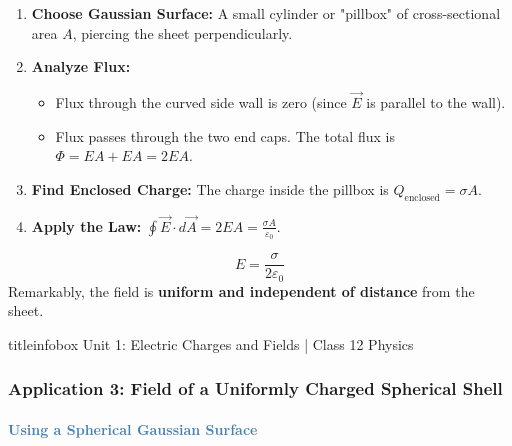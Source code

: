 \begin{frame}
\begin{frame}
\begin{examplebox}
\vspace{0.1cm}
\begin{enumerate}
    \item \textbf{Choose Gaussian Surface:} A small cylinder or "pillbox" of cross-sectional area $A$, piercing the sheet perpendicularly.
    \item \textbf{Analyze Flux:}
    \begin{itemize}
        \item Flux through the curved side wall is zero (since $\vec{E}$ is parallel to the wall).
        \item Flux passes through the two end caps. The total flux is $\Phi = EA + EA = 2EA$.
    \end{itemize}
    \item \textbf{Find Enclosed Charge:} The charge inside the pillbox is $Q_{\text{enclosed}} = \sigma A$.
    \item \textbf{Apply the Law:} $\oint \vec{E} \cdot d\vec{A} = 2EA = \frac{\sigma A}{\varepsilon_0}$.
\end{enumerate}
\vspace{0.1cm}
\end{examplebox}

\vspace{0.3cm}

\begin{formulabox}
\vspace{0.1cm}
\begin{equation*}
\boxed{E = \frac{\sigma}{2\varepsilon_0}}
\end{equation*}
Remarkably, the field is \textbf{uniform and independent of distance} from the sheet.
\vspace{0.1cm}
\end{formulabox}

\vfill

\begin{beamercolorbox}[wd=\textwidth,ht=0.5cm,dp=0.1cm,center]{titleinfobox}
    \small\color{coolgray} Unit 1: Electric Charges and Fields | Class 12 Physics
\end{beamercolorbox}
\end{frame}

\begin{frame}
\frametitle{\textsf{\textbf{Application 3: Field of a Uniformly Charged Spherical Shell}}}
\framesubtitle{\textcolor{steelblue}{Using a Spherical Gaussian Surface}}


\end{frame}
\end{frame}
